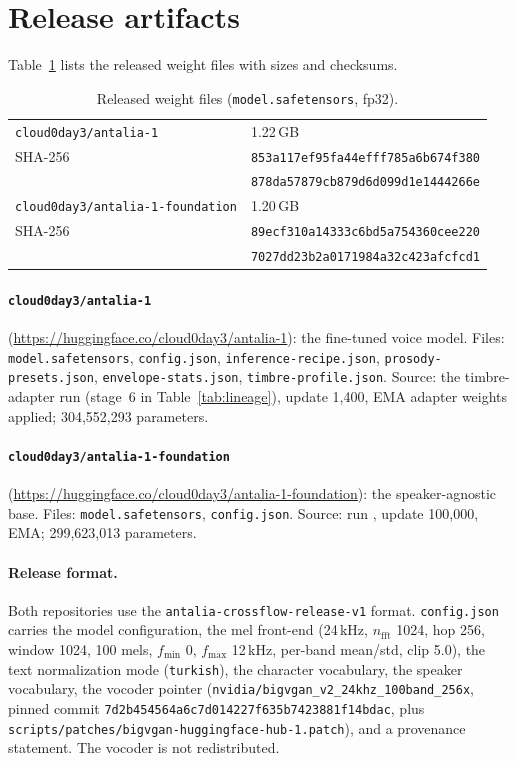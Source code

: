 \documentclass[10pt,twocolumn]{article}
\newcommand{\code}[1]{\texttt{#1}}
\begin{document}
\section{Release artifacts}
\label{sec:release}

Table~\ref{tab:artifacts} lists the released weight files with sizes and checksums.

\begin{table}[t]
\centering
\footnotesize
\caption{Released weight files (\code{model.safetensors}, fp32).}
\label{tab:artifacts}
\begin{tabular}{@{}ll@{}}
\toprule
\code{cloud0day3/antalia-1} & 1.22\,GB \\
\quad SHA-256 & \code{853a117ef95fa44efff785a6b674f380} \\
 & \code{878da57879cb879d6d099d1e1444266e} \\
\midrule
\code{cloud0day3/antalia-1-foundation} & 1.20\,GB \\
\quad SHA-256 & \code{89ecf310a14333c6bd5a754360cee220} \\
 & \code{7027dd23b2a0171984a32c423afcfcd1} \\
\bottomrule
\end{tabular}
\end{table}

\paragraph{\code{cloud0day3/antalia-1}} (\url{https://huggingface.co/cloud0day3/antalia-1}): the fine-tuned voice model. Files: \code{model.safetensors}, \code{config.json}, \code{inference-recipe.json}, \code{prosody-presets.json}, \code{envelope-stats.json}, \code{timbre-profile.json}. Source: the timbre-adapter run (stage~6 in Table~\ref{tab:lineage}), update 1,400, EMA adapter weights applied; 304,552,293 parameters.

\paragraph{\code{cloud0day3/antalia-1-foundation}} (\url{https://huggingface.co/cloud0day3/antalia-1-foundation}): the speaker-agnostic base. Files: \code{model.safetensors}, \code{config.json}. Source: run , update 100,000, EMA; 299,623,013 parameters.

\paragraph{Release format.} Both repositories use the \code{antalia-crossflow-release-v1} format. \code{config.json} carries the model configuration, the mel front-end (24\,kHz, $n_{\mathrm{fft}}$ 1024, hop 256, window 1024, 100 mels, $f_{\min}$ 0, $f_{\max}$ 12\,kHz, per-band mean/std, clip 5.0), the text normalization mode (\code{turkish}), the character vocabulary, the speaker vocabulary, the vocoder pointer (\code{nvidia/bigvgan\_v2\_24khz\_100band\_256x}, pinned commit \code{7d2b454564a6c7d014227f635b7423881f14bdac}, plus \code{scripts/patches/bigvgan-huggingface-hub-1.patch}), and a provenance statement. The vocoder is not redistributed.
\end{document}
